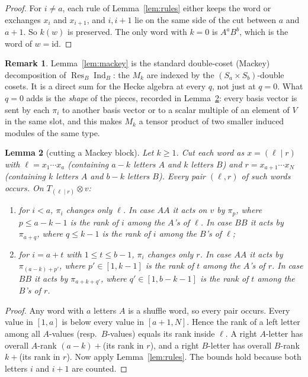 \documentclass[11pt]{amsart}
\newcommand{\Ind}{\operatorname{Ind}}
\newcommand{\Res}{\operatorname{Res}}
\theoremstyle{plain}
\newtheorem{lemma}{Lemma}[section]
\theoremstyle{definition}
\newtheorem{remark}[lemma]{Remark}
\begin{document}
\begin{proof}
For $i\neq a$, each rule of Lemma~\ref{lem:rules} either keeps the word or exchanges $x_i$ and $x_{i+1}$, and $i,i+1$ lie on the same side of the cut between $a$ and $a+1$. So $k(w)$ is preserved. The only word with $k=0$ is $A^aB^b$, which is the word of $w=\mathrm{id}$.
\end{proof}

\begin{remark}\label{rem:mackey-any-q}
Lemma~\ref{lem:mackey} is the standard double-coset (Mackey) decomposition of $\Res_B\Ind_B$: the $M_k$ are indexed by the $(S_a\times S_b)$-double cosets. It is a direct sum for the Hecke algebra at every $q$, not just at $q=0$. What $q=0$ adds is the \emph{shape} of the pieces, recorded in Lemma~\ref{lem:cut}: every basis vector is sent by each $\pi_i$ to another basis vector or to a scalar multiple of an element of $V$ in the same slot, and this makes $M_k$ a tensor product of two smaller induced modules of the same type.
\end{remark}

\begin{lemma}[cutting a Mackey block]\label{lem:cut}
Let $k\ge1$. Cut each word as $x=(\ell\mid r)$ with $\ell=x_1\cdots x_a$ (containing $a-k$ letters $A$ and $k$ letters $B$) and $r=x_{a+1}\cdots x_N$ (containing $k$ letters $A$ and $b-k$ letters $B$). Every pair $(\ell,r)$ of such words occurs. On $T_{(\ell\mid r)}\otimes v$:
\begin{enumerate}[label=\textup{(\alph*)},itemsep=1pt]
\item for $i<a$, $\pi_i$ changes only $\ell$. In case $AA$ it acts on $v$ by $\pi_p$, where $p\le a-k-1$ is the rank of $i$ among the $A$'s \emph{of $\ell$}. In case $BB$ it acts by $\pi_{a+q}$, where $q\le k-1$ is the rank of $i$ among the $B$'s of $\ell$;
\item for $i=a+t$ with $1\le t\le b-1$, $\pi_i$ changes only $r$. In case $AA$ it acts by $\pi_{(a-k)+p'}$, where $p'\in[1,k-1]$ is the rank of $t$ among the $A$'s of $r$. In case $BB$ it acts by $\pi_{a+k+q'}$, where $q'\in[1,b-k-1]$ is the rank of $t$ among the $B$'s of $r$.
\end{enumerate}
\end{lemma}

\begin{proof}
Any word with $a$ letters $A$ is a shuffle word, so every pair occurs. Every value in $[1,a]$ is below every value in $[a+1,N]$. Hence the rank of a left letter among all $A$-values (resp.\ $B$-values) equals its rank inside $\ell$. A right $A$-letter has overall $A$-rank $(a-k)+{}$(its rank in $r$), and a right $B$-letter has overall $B$-rank $k+{}$(its rank in $r$). Now apply Lemma~\ref{lem:rules}. The bounds hold because both letters $i$ and $i+1$ are counted.
\end{proof}
\end{document}
